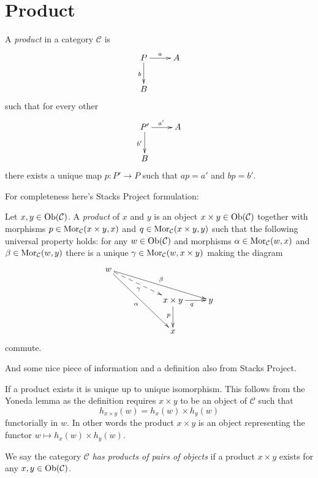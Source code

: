 \section{Product}
\label{section-product}

\begin{definition}
\label{definition-product}
A {\it product} in a category $\mathcal{C}$
is
$$
\xymatrix{
P\ar[d]_b \ar[r]^a&A\\
B
}
$$
such that for every other
$$
\xymatrix{
P'\ar[d]_{b'} \ar[r]^{a'}&A\\
B
}
$$
there exists a unique map $p:P'\to P$ such
that
$ap=a'$ and  $bp=b'$.

\end{definition}

For completeness here's Stacks Project
formulation:

\begin{definition}
\label{definition-products}
Let $x, y\in \mathop{\mathrm{Ob}}\nolimits(\mathcal{C})$.
A {\it product} of $x$ and $y$ is
an object $x \times y \in \mathop{\mathrm{Ob}}\nolimits(\mathcal{C})$
together with morphisms
$p\in \mathop{\mathrm{Mor}}\nolimits_{\mathcal C}(x \times y, x)$ and
$q\in\mathop{\mathrm{Mor}}\nolimits_{\mathcal C}(x \times y, y)$ such
that the following universal property holds:
for
any $w\in \mathop{\mathrm{Ob}}\nolimits(\mathcal{C})$ and morphisms
$\alpha \in \mathop{\mathrm{Mor}}\nolimits_{\mathcal C}(w, x)$ and
$\beta \in \mathop{\mathrm{Mor}}\nolimits_\mathcal{C}(w, y)$
there is a unique
$\gamma\in \mathop{\mathrm{Mor}}\nolimits_{\mathcal C}(w, x \times y)$
making
the diagram
$$
\xymatrix{
w \ar[rrrd]^\beta \ar@{-->}[rrd]_\gamma
\ar[rrdd]_\alpha & & \\
& & x \times y \ar[d]_p \ar[r]_q & y \\
& & x &
}
$$
commute.
\end{definition}

And some nice piece of information and a
definition also from Stacks Project.

\medskip\noindent
If a product exists it is unique up to unique
isomorphism. This follows from the Yoneda
lemma as
the definition requires $x \times y$ to be an
object
of $\mathcal{C}$ such that
$$
h_{x \times y}(w) = h_x(w) \times h_y(w)
$$
functorially in $w$. In other words the
product $x \times y$
is an object representing the functor
$w \mapsto h_x(w) \times h_y(w)$.

\begin{definition}
\label{definition-has-products-of-pairs}
We say the category $\mathcal{C}$ {\it has
products of pairs
of objects} if a product $x \times y$
exists for any $x, y \in \mathop{\mathrm{Ob}}\nolimits(\mathcal{C})$.
\end{definition}

